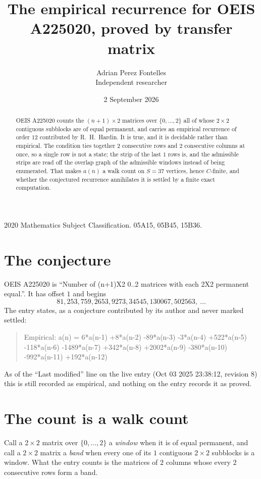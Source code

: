 \documentclass[11pt,a4paper]{article}
\title{The empirical recurrence for OEIS A225020, proved by transfer matrix}
\author{Adrian Perez Fontelles\\ \small Independent researcher}
\date{2 September 2026}
\theoremstyle{plain}
\theoremstyle{definition}
\begin{document}
\maketitle

\begin{abstract}
OEIS A225020 counts the $(n+1)\times2$ matrices over $\{0,\dots,2\}$ all of whose
$2\times2$ contiguous subblocks are of equal permanent, and carries an empirical recurrence of order
$12$ contributed by R.~H.~Hardin. It is true, and it is decidable rather than empirical.
The condition ties together $2$ consecutive rows and $2$ consecutive columns at once, so a
single row is not a state; the strip of the last $1$ rows is, and the admissible strips
are read off the overlap graph of the admissible windows instead of being enumerated. That
makes $a(n)$ a walk count on $S=37$ vertices, hence $C$-finite, and whether the conjectured
recurrence annihilates it is settled by a finite exact computation.
\end{abstract}

\noindent\small 2020 Mathematics Subject Classification. 05A15, 05B45, 15B36.\normalsize

\section{The conjecture}

OEIS A225020 is ``Number of (n+1)X2 0..2 matrices with each 2X2 permanent equal.''. It has offset $1$ and begins
\[
81, 253, 759, 2653, 9273, 34545, 130067, 502563,\ \dots
\]
The entry states, as a conjecture contributed by its author and never marked settled:
\begin{quote}
Empirical: a(n) = 6*a(n-1) +8*a(n-2) -89*a(n-3) -3*a(n-4) +522*a(n-5) -118*a(n-6) -1489*a(n-7) +342*a(n-8) +2002*a(n-9) -380*a(n-10) -992*a(n-11) +192*a(n-12)
\end{quote}
As of the ``Last modified'' line on the live entry (Oct 03 2025 23:38:12, revision 8) this is still
recorded as empirical, and nothing on the entry records it as proved.

\section{The count is a walk count}

Call a $2\times2$ matrix over $\{0,\dots,2\}$ a \emph{window} when it is of equal permanent, and
call a $2\times2$ matrix a \emph{band} when every one of its $1$ contiguous
$2\times2$ subblocks is a window. What the entry counts is the matrices of $2$ columns
whose every $2$ consecutive rows form a band.
\end{document}
